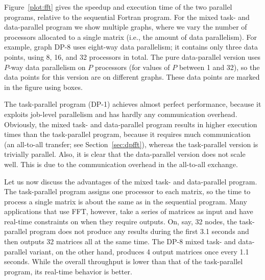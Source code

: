 \documentclass{acmtrans2e}
\begin{document}

Figure~\ref{plot:fft} gives the speedup and execution time
of the two parallel programs, relative to the sequential Fortran program.
For the mixed task- and data-parallel program we show multiple graphs,
where we vary the number of processors allocated to a single matrix
(i.e., the amount of data parallelism).
For example, graph DP-8 uses eight-way data parallelism; it contains
only three data points, using 8, 16, and 32 processors in total.
The pure data-parallel version uses $P$-way data parallelism on $P$ processors
(for values of $P$ between 1 and 32),
so the data points for this version are on different graphs. These
data points are marked in the figure using boxes.

The task-parallel program (DP-1) achieves almost perfect performance, because
it exploits job-level parallelism and has hardly any communication overhead.
Obviously, the mixed task- and data-parallel program results in higher
execution times than the task-parallel program, because
it requires much communication
(an all-to-all transfer; see Section~\ref{sec:dpfft}), whereas the task-parallel
version is trivially parallel.
Also, it is clear that the data-parallel version does not scale well.
This is due to the communication overhead in the all-to-all exchange.

Let us now discuss the advantages of the mixed task- and data-parallel program.
The task-parallel program assigns one processor to each matrix, so
the time to process a single matrix is about the same as in the sequential
program.
Many applications that use FFT, however, take a series of matrices
as input and have real-time constraints on when they require outputs.
On, say, 32 nodes, the task-parallel program does not produce any results
during the first 3.1 seconds and then outputs 32 matrices all at the same time.
The DP-8 mixed task- and data-parallel variant, on the other hand, produces 4
output matrices once every 1.1 seconds. While the overall throughput
is lower than that of the task-parallel program, its real-time behavior
is better.
\end{document}
